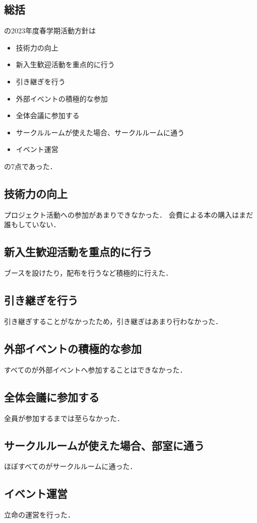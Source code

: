 \subsection*{\secondGrade{}総括}


\secondGrade{}の2023年度春学期活動方針は
\begin{itemize}
    \item 技術力の向上
    \item 新入生歓迎活動を重点的に行う
    \item 引き継ぎを行う
    \item 外部イベントの積極的な参加
    \item 全体会議に参加する
    \item サークルルームが使えた場合、サークルルームに通う
    \item イベント運営
\end{itemize}
の7点であった．

\subsection*{技術力の向上}
プロジェクト活動への参加があまりできなかった．
会費による本の購入はまだ誰もしていない．

\subsection*{新入生歓迎活動を重点的に行う}
ブースを設けたり，配布を行うなど積極的に行えた．

\subsection*{引き継ぎを行う}
引き継ぎすることがなかったため，引き継ぎはあまり行わなかった．

\subsection*{外部イベントの積極的な参加}
すべての\secondGrade{}が外部イベントへ参加することはできなかった．

\subsection*{全体会議に参加する}
全員が参加するまでは至らなかった．

\subsection*{サークルルームが使えた場合、部室に通う}
ほぼすべての\secondGrade{}がサークルルームに通った．

\subsection*{イベント運営}
立命の運営を行った．
